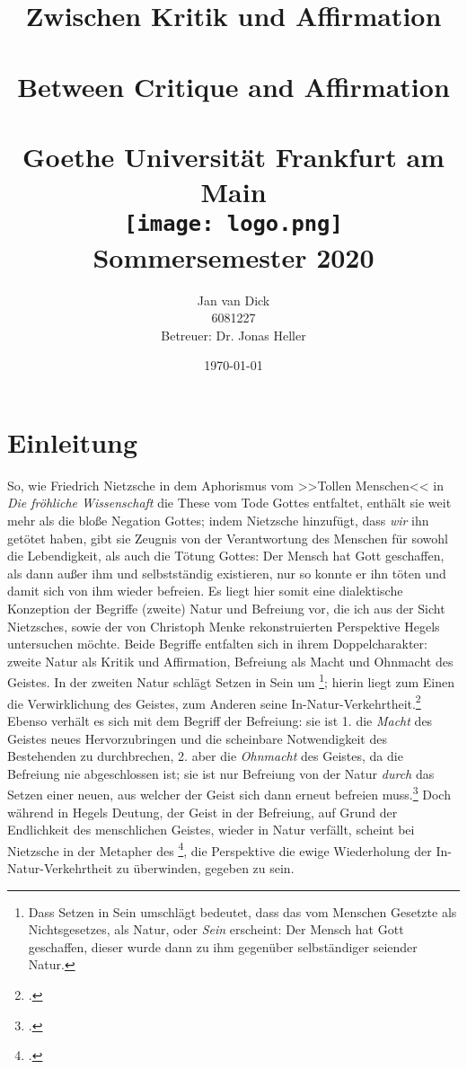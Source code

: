 \documentclass[12pt, a4paper, openany]{report}
\title{
    {\textbf{Zwischen Kritik und Affirmation}}\\ 
    {\large \color{darkgray}{Zweite Natur und Befreiung bei Hegel und Nietzsche}}\\
    {\bigskip}
    {\textbf{Between Critique and Affirmation}}\\
    {\large \color{darkgray}{Second Natur and Liberation in the Philosophies of Hegel and Nietzsche}}\\
    {\bigskip}
    {\large Goethe Universität Frankfurt am Main}\\
    {\bigskip}    
    {\bigskip}
    {\bigskip}    
    {\texttt{[image: logo.png]}}\\
    {\bigskip}    
    {Sommersemester 2020}\\
}
\author{
    {Jan van Dick}\\
    {6081227}\\
    {Betreuer: Dr. Jonas Heller}
}
\date{\today}
\begin{document}
\maketitle
\frontmatter

\onehalfspacing
\tableofcontents

\mainmatter

\chapter{Einleitung}
So, wie Friedrich Nietzsche in dem Aphorismus vom >>Tollen Menschen<< in \emph{Die fröhliche Wissenschaft} die These vom Tode Gottes entfaltet, enthält sie weit mehr als die bloße Negation Gottes;
indem Nietzsche hinzufügt, dass \emph{wir} ihn getötet haben, gibt sie Zeugnis von der Verantwortung des Menschen für sowohl die Lebendigkeit, als auch die Tötung Gottes: 
Der Mensch hat Gott geschaffen, als dann außer ihm und selbstständig existieren, nur so konnte er ihn töten und damit sich von ihm wieder befreien.
Es liegt hier somit eine dialektische Konzeption der Begriffe (zweite) Natur und Befreiung vor, die ich aus der Sicht Nietzsches, sowie der von Christoph Menke rekonstruierten Perspektive Hegels untersuchen möchte.
Beide Begriffe entfalten sich in ihrem Doppelcharakter: zweite Natur als Kritik und Affirmation, Befreiung als Macht und Ohnmacht des Geistes.
In der zweiten Natur schlägt Setzen in Sein um%
\footnote{
    Dass Setzen in Sein umschlägt bedeutet, dass das vom Menschen Gesetzte als Nichtsgesetzes, als Natur, oder \emph{Sein} erscheint: 
    Der Mensch hat Gott geschaffen, dieser wurde dann zu ihm gegenüber selbständiger seiender Natur. 
}; 
hierin liegt zum Einen die Verwirklichung des Geistes, zum Anderen seine In-Natur-Verkehrtheit.\footcite[Vgl.][145]{menke_autonomie_2018}
Ebenso verhält es sich mit dem Begriff der Befreiung: 
sie ist 1. die \emph{Macht} des Geistes neues Hervorzubringen und die scheinbare Notwendigkeit des Bestehenden zu durchbrechen, 
2. aber die \emph{Ohnmacht} des Geistes, da die Befreiung nie abgeschlossen ist; 
sie ist nur Befreiung von der Natur \emph{durch} das Setzen einer neuen, aus welcher der Geist sich dann erneut befreien muss.\footcite[Vgl.][80]{menke_autonomie_2018}
Doch während in Hegels Deutung, der Geist in der Befreiung, auf Grund der Endlichkeit des menschlichen Geistes, wieder in Natur verfällt, scheint bei Nietzsche in der Metapher des \footcite[Vgl.][574]{nietzsche_morgenrote_1999}, die Perspektive die ewige Wiederholung der In-Natur-Verkehrtheit zu überwinden, gegeben zu sein.
\end{document}
